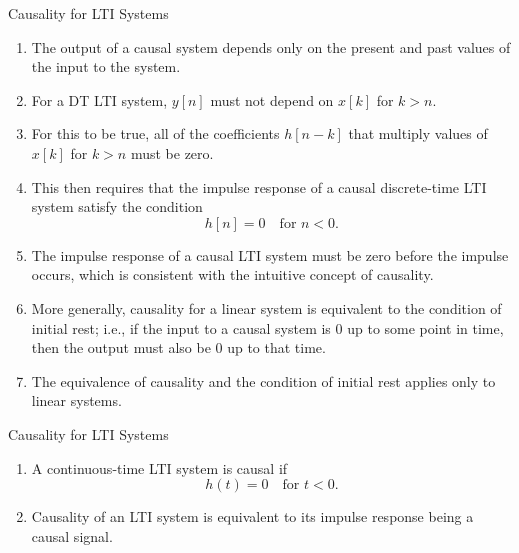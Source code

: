 \begin{frame}{Causality for LTI Systems}

    \begin{enumerate}
        \item The output of a causal system depends only on the present and past values of the input to the system.
        \item For a DT LTI system, $y[n]$ must not depend on $x[k]$ for $k > n$.
        \item For this to be true, all of the coefficients $h[n- k]$ that multiply values of $x[k]$ for $k > n$ must be zero.
        \item This then requires that the impulse response of a causal discrete-time LTI system satisfy the condition
            \begin{equation*}
                h[n] = 0\quad \text{for } n < 0.
            \end{equation*}
        \item The impulse response of a causal LTI system must be zero before the impulse occurs, which is consistent with the intuitive concept of causality.
        \item More generally, causality for a linear system is equivalent to the condition of initial rest; i.e., if the input to a causal system is 0 up to some point in time, then the output must also be 0 up to that time.
        \item The equivalence of causality and the condition of initial rest applies only to linear systems.
    \end{enumerate}
\end{frame}

\begin{frame}{Causality for LTI Systems}

    \begin{enumerate}
        \item A continuous-time LTI system is causal if
            \begin{equation*}
                h(t) = 0\quad \text{for } t < 0.
            \end{equation*}
        \item Causality of an LTI system is equivalent to its impulse response being a causal signal.
    \end{enumerate}
\end{frame}

